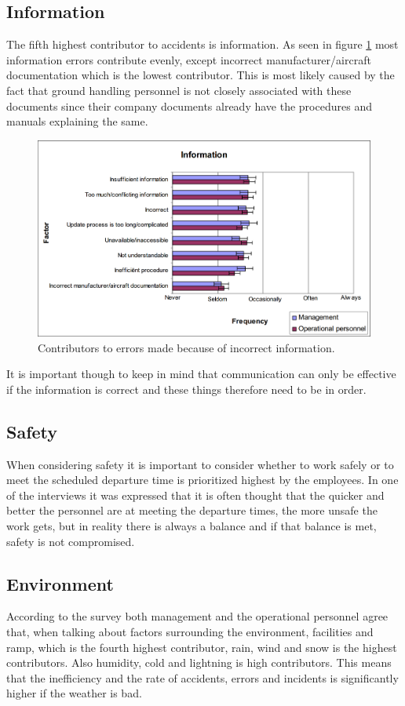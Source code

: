 \subsection{Information} %
The fifth highest contributor to accidents is information. As seen in figure \ref{Information} most information errors contribute evenly, except  incorrect manufacturer/aircraft documentation which is the lowest contributor. This is most likely caused by the fact that ground handling personnel is not closely associated with these documents since their company documents already have the procedures and manuals explaining the same.

\begin{figure}[H]
\centering
\includegraphics[width=\textwidth]{Grafik/Information}
\caption{Contributors to errors made because of incorrect information.}
\label{Information}
\end{figure}

It is important though to keep in mind that communication can only be effective if the information is correct and these things therefore need to be in order.

\subsection{Safety}
When considering safety it is important to consider whether to work safely or to meet the scheduled departure time is prioritized highest by the employees. In one of the interviews it was expressed that it is often thought that the quicker and better the personnel are at meeting the departure times, the more unsafe the work gets, but in reality there is always a balance and if that balance is met, safety is not compromised.

\subsection{Environment}
According to the survey both management and the operational personnel agree that, when talking about factors surrounding the environment, facilities and ramp, which is the fourth highest contributor, rain, wind and snow is the highest contributors. Also humidity, cold and lightning is high contributors. This means that the inefficiency and the rate of accidents, errors and incidents is significantly higher if the weather is bad.

